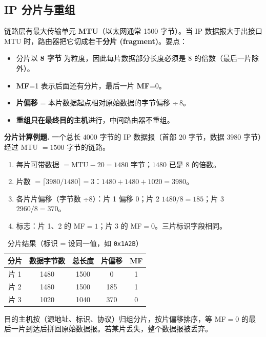 \subsection{IP 分片与重组}

链路层有最大传输单元 \textbf{MTU}（以太网通常 1500 字节）。当 IP 数据报大于出接口 MTU 时，路由器把它切成若干\textbf{分片 (fragment)}。要点：

\begin{itemize}
    \item 分片以 \textbf{8 字节} 为粒度，因此每片数据部分长度必须是 8 的倍数（最后一片除外）。
    \item \textbf{MF}=1 表示后面还有分片，最后一片 \textbf{MF}=0。
    \item \textbf{片偏移} = 本片数据起点相对原始数据的字节偏移 $\div\,8$。
    \item \textbf{重组只在最终目的主机}进行，中间路由器不重组。
\end{itemize}

\noindent\textbf{分片计算例题.} 一个总长 $4000$ 字节的 IP 数据报（首部 $20$ 字节，数据 $3980$ 字节）经过 MTU $=1500$ 字节的链路。

\begin{enumerate}
    \item 每片可带数据 $= \text{MTU} - 20 = 1480$ 字节；$1480$ 已是 8 的倍数。
    \item 片数 $= \lceil 3980 / 1480 \rceil = 3$：$1480 + 1480 + 1020 = 3980$。
    \item 各片片偏移（字节数 $\div 8$）：片 1 偏移 $0$；片 2 $1480/8=185$；片 3 $2960/8=370$。
    \item 标志：片 1、2 的 MF$=1$；片 3 的 MF$=0$。三片标识字段相同。
\end{enumerate}

\begin{table}[H]
\centering
\caption{分片结果（标识 = 设同一值，如 \texttt{0x1A2B}）}
\begin{tabulary}{\textwidth}{CCCCC}
\toprule
分片 & 数据字节数 & 总长度 & 片偏移 & MF \\
\midrule
片 1 & 1480 & 1500 & 0 & 1 \\
片 2 & 1480 & 1500 & 185 & 1 \\
片 3 & 1020 & 1040 & 370 & 0 \\
\bottomrule
\end{tabulary}
\end{table}

\noindent 目的主机按（源地址、标识、协议）归组分片，按片偏移排序，等 MF$=0$ 的最后一片到达后拼回原始数据报。若某片丢失，整个数据报被丢弃。

